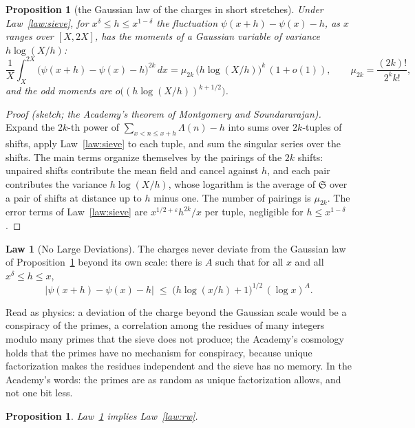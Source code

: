 \documentclass[11pt]{article}
\newtheorem{proposition}[theorem]{Proposition}
\theoremstyle{definition}
\newtheorem{law}{Law}
\theoremstyle{remark}
\newcommand{\ps}{\psi}
\begin{document}
\begin{proposition}[the Gaussian law of the charges in short stretches]\label{prop:gauss}
Under Law~\ref{law:sieve}, for $x^{\delta}\le h\le x^{1-\delta}$ the fluctuation $\ps(x+h)-\ps(x)-h$, as $x$ ranges over $[X,2X]$, has the moments of a Gaussian variable of variance $h\log(X/h)$:
\[
\frac1X\int_X^{2X}\big(\ps(x+h)-\ps(x)-h\big)^{2k}\,dx=\mu_{2k}\,\big(h\log(X/h)\big)^k\,(1+o(1)),\qquad \mu_{2k}=\frac{(2k)!}{2^kk!},
\]
and the odd moments are $o\big((h\log(X/h))^{k+1/2}\big)$.
\end{proposition}

\begin{proof}[Proof (sketch; the Academy's theorem of Montgomery and Soundararajan)]
Expand the $2k$-th power of $\sum_{x<n\le x+h}\Lambda(n)-h$ into sums over $2k$-tuples of shifts, apply Law~\ref{law:sieve} to each tuple, and sum the singular series over the shifts. The main terms organize themselves by the pairings of the $2k$ shifts: unpaired shifts contribute the mean field and cancel against $h$, and each pair contributes the variance $h\log(X/h)$, whose logarithm is the average of $\mathfrak S$ over a pair of shifts at distance up to $h$ minus one. The number of pairings is $\mu_{2k}$. The error terms of Law~\ref{law:sieve} are $x^{1/2+\varepsilon}h^{2k}/x$ per tuple, negligible for $h\le x^{1-\delta}$.
\end{proof}

\begin{law}[No Large Deviations]\label{law:nld}
The charges never deviate from the Gaussian law of Proposition~\ref{prop:gauss} beyond its own scale: there is $A$ such that for all $x$ and all $x^\delta\le h\le x$,
\[
\big|\ps(x+h)-\ps(x)-h\big|\;\le\;\big(h\log(x/h)+1\big)^{1/2}\,(\log x)^{A}.
\]
\end{law}

Read as physics: a deviation of the charge beyond the Gaussian scale would be a conspiracy of the primes, a correlation among the residues of many integers modulo many primes that the sieve does not produce; the Academy's cosmology holds that the primes have no mechanism for conspiracy, because unique factorization makes the residues independent and the sieve has no memory. In the Academy's words: the primes are as random as unique factorization allows, and not one bit less.

\begin{proposition}\label{prop:nld}
Law~\ref{law:nld} implies Law~\ref{law:rw}.
\end{proposition}
\end{document}
